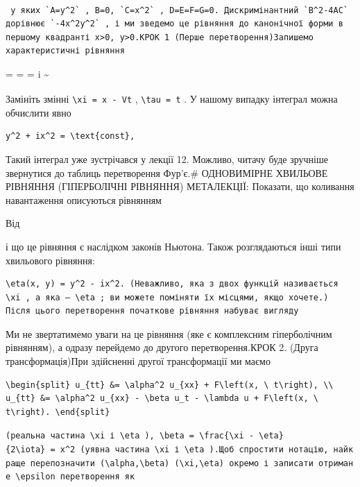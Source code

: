 \documentclass[
  ukrainian,
]{article}
\begin{document}
\begin{verbatim}

 у яких `A=y^2` , B=0, `C=x^2` , D=E=F=G=0. Дискримінантний `B^2-4AC` дорівнює `-4x^2y^2` , і ми зведемо це рівняння до канонічної форми в першому квадранті x>0, y>0.КРОК 1 (Перше перетворення)Запишемо характеристичні рівняння 
\end{verbatim}

 =  =
 = i
\textsubscript{}\textasciitilde{}

Замініть змінні \texttt{\textbackslash{}xi\ =\ x\ -\ Vt} ,
\texttt{\textbackslash{}tau\ =\ t} . У нашому випадку інтеграл можна
обчислити явно

\begin{verbatim}
y^2 + ix^2 = \text{const},
\end{verbatim}

Такий інтеграл уже зустрічався у лекції 12. Можливо, читачу буде
зручніше звернутися до таблиць перетворення Фур'є.\# ОДНОВИМІРНЕ
ХВИЛЬОВЕ РІВНЯННЯ (ГІПЕРБОЛІЧНІ РІВНЯННЯ) МЕТАЛЕКЦІЇ: Показати, що
коливання навантаження описуються рівнянням

Від

і що це рівняння є наслідком законів Ньютона. Також розглядаються інші
типи хвильового рівняння:

\begin{verbatim}
\eta(x, y) = y^2 - ix^2. (Неважливо, яка з двох функцій називається \xi , а яка — \eta ; ви можете поміняти їх місцями, якщо хочете.) Після цього перетворення початкове рівняння набуває вигляду
\end{verbatim}

Ми не звертатимемо уваги на це рівняння (яке є комплексним гіперболічним
рівнянням), а одразу перейдемо до другого перетворення.КРОК 2. (Друга
трансформація)При здійсненні другої трансформації ми маємо

\begin{verbatim}
\begin{split} u_{tt} &= \alpha^2 u_{xx} + F\left(x, \ t\right), \\ u_{tt} &= \alpha^2 u_{xx} - \beta u_t - \lambda u + F\left(x, \ t\right). \end{split}
\end{verbatim}

\texttt{(реальна\ частина\ \textquotesingle{}\textbackslash{}xi\textquotesingle{}\ і\ \textquotesingle{}\textbackslash{}eta\textquotesingle{}\ ),\ \textquotesingle{}\textbackslash{}beta\ =\ \textbackslash{}frac\{\textbackslash{}xi\ -\ \textbackslash{}eta\}\{2\textbackslash{}iota\}\ =\ x\^{}2\textquotesingle{}\ (уявна\ частина\ \textquotesingle{}\textbackslash{}xi\textquotesingle{}\ і\ \textquotesingle{}\textbackslash{}eta\textquotesingle{}\ ).Щоб\ спростити\ нотацію,\ найкраще\ перепозначити\ \textquotesingle{}(\textbackslash{}alpha,\textbackslash{}beta)\textquotesingle{}\ \textquotesingle{}(\textbackslash{}xi,\textbackslash{}eta)\textquotesingle{}\ окремо\ і\ записати\ отримане\ \textquotesingle{}\textbackslash{}epsilon\textquotesingle{}\ перетворення\ як}
\end{document}

